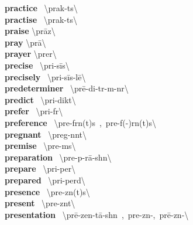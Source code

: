 \documentclass[10pt,a4paper]{article}
\begin{document}
\begin{multicols}{2}
\textbf{ practice }\quad \ \textbackslash \textprimstress prak-t\textschwa s\textbackslash \\
\textbf{ practise }\quad \ \textbackslash \textprimstress prak-t\textschwa s\textbackslash \\
\textbf{ praise }\quad \textbackslash \textprimstress pr\={a}z\textbackslash \\
\textbf{ pray }\quad \textbackslash \textprimstress pr\={a}\textbackslash \\
\textbf{ prayer }\quad \textbackslash \textprimstress prer\textbackslash \\
\textbf{ precise }\quad \ \textbackslash pri-\textprimstress s\={i}s\textbackslash \\
\textbf{ precisely }\quad \ \textbackslash pri-\textprimstress s\={i}s-l\={e}\textbackslash \\
\textbf{ predeterminer }\quad \ \textbackslash \textsecstress pr\={e}-di-\textprimstress t\textschwa r-m\textschwa -n\textschwa r\textbackslash \\
\textbf{ predict }\quad \ \textbackslash pri-\textprimstress dikt\textbackslash \\
\textbf{ prefer }\quad \ \textbackslash pri-\textprimstress f\textschwa r\textbackslash \\
\textbf{ preference }\quad \ \textbackslash \textprimstress pre-f\textschwa rn(t)s\ ,\ \textprimstress pre-f(\textschwa -)r\textschwa n(t)s\textbackslash \\
\textbf{ pregnant }\quad \ \textbackslash \textprimstress preg-n\textschwa nt\textbackslash \\
\textbf{ premise }\quad \ \textbackslash \textprimstress pre-m\textschwa s\textbackslash \\
\textbf{ preparation }\quad \ \textbackslash \textsecstress pre-p\textschwa -\textprimstress r\={a}-sh\textschwa n\textbackslash \\
\textbf{ prepare }\quad \ \textbackslash pri-\textprimstress per\textbackslash \\
\textbf{ prepared }\quad \ \textbackslash pri-\textprimstress perd\textbackslash \\
\textbf{ presence }\quad \ \textbackslash \textprimstress pre-z\textsuperscript{\textreve}n(t)s\textbackslash \\
\textbf{ present }\quad \ \textbackslash \textprimstress pre-z\textsuperscript{\textreve}nt\textbackslash \\
\textbf{ presentation }\quad \ \textbackslash \textsecstress pr\={e}-\textsecstress zen-\textprimstress t\={a}-sh\textschwa n\ ,\ \textsecstress pre-z\textsuperscript{\textreve}n-,\ \textsecstress pr\={e}-z\textsuperscript{\textreve}n-\textbackslash \\

\end{multicols}
\end{document}
